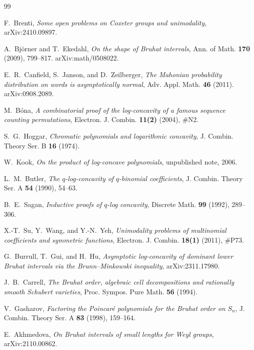 \documentclass[11pt]{amsart}
\theoremstyle{plain}
\theoremstyle{definition}
\theoremstyle{remark}
\begin{document}
\begin{thebibliography}{99}

F.~Brenti, \emph{Some open problems on Coxeter groups and unimodality},
arXiv:2410.09897.

A.~Bj\"orner and T.~Ekedahl, \emph{On the shape of Bruhat intervals}, Ann. of
Math. \textbf{170} (2009), 799--817. arXiv:math/0508022.

E.~R.~Canfield, S.~Janson, and D.~Zeilberger, \emph{The Mahonian probability
distribution on words is asymptotically normal}, Adv. Appl. Math.
\textbf{46} (2011). arXiv:0908.2089.

M.~B\'ona, \emph{A combinatorial proof of the log-concavity of a famous
sequence counting permutations}, Electron. J. Combin. \textbf{11(2)} (2004),
\#N2.

S.~G.~Hoggar, \emph{Chromatic polynomials and logarithmic concavity}, J.
Combin. Theory Ser. B \textbf{16} (1974).

W.~Kook, \emph{On the product of log-concave polynomials}, unpublished
note, 2006.

L.~M.~Butler, \emph{The $q$-log-concavity of $q$-binomial coefficients}, J.
Combin. Theory Ser. A \textbf{54} (1990), 54--63.

B.~E.~Sagan, \emph{Inductive proofs of $q$-log concavity}, Discrete Math.
\textbf{99} (1992), 289--306.

X.-T.~Su, Y.~Wang, and Y.-N.~Yeh, \emph{Unimodality problems of multinomial
coefficients and symmetric functions}, Electron. J. Combin. \textbf{18(1)}
(2011), \#P73.

G.~Burrull, T.~Gui, and H.~Hu, \emph{Asymptotic log-concavity of dominant
lower Bruhat intervals via the Brunn--Minkowski inequality}, arXiv:2311.17980.

J.~B.~Carrell, \emph{The Bruhat order, algebraic cell decompositions and
rationally smooth Schubert varieties}, Proc. Sympos. Pure Math.
\textbf{56} (1994).

V.~Gasharov, \emph{Factoring the Poincar\'e polynomials for the Bruhat
order on $S_n$}, J. Combin. Theory Ser. A \textbf{83} (1998), 159--164.

E.~Akhmedova, \emph{On Bruhat intervals of small lengths for Weyl groups},
arXiv:2110.00862.


\end{thebibliography}
\end{document}
